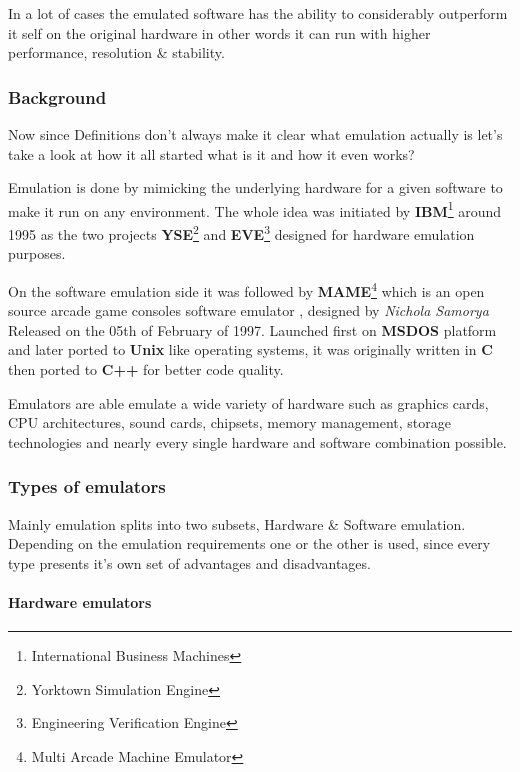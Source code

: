 \documentclass[
  14pt,
  english,
  a4paper,
]{scrreprt}
\begin{document}
In a lot of cases the emulated software has the ability to considerably
outperform it self on the original hardware in other words it can run
with higher performance, resolution \& stability.

\hypertarget{background}{%
\subsubsection{Background}\label{background}}

Now since Definitions don't always make it clear what emulation actually
is let's take a look at how it all started what is it and how it even
works?

Emulation is done by mimicking the underlying hardware for a given
software to make it run on any environment. The whole idea was initiated
by \textbf{IBM}\footnote{International Business Machines} around 1995 as
the two projects \textbf{YSE}\footnote{Yorktown Simulation Engine} and
\textbf{EVE}\footnote{Engineering Verification Engine} designed for
hardware emulation purposes.

On the software emulation side it was followed by
\textbf{MAME}\footnote{Multi Arcade Machine Emulator} which is an open
source arcade game consoles software emulator , designed by
\emph{Nichola Samorya} Released on the 05th of February of 1997.
Launched first on \textbf{MSDOS} platform and later ported to
\textbf{Unix} like operating systems, it was originally written in
\textbf{C} then ported to \textbf{C++} for better code quality.

Emulators are able emulate a wide variety of hardware such as graphics
cards, CPU architectures, sound cards, chipsets, memory management,
storage technologies and nearly every single hardware and software
combination possible.

\hypertarget{types-of-emulators}{%
\subsubsection{Types of emulators}\label{types-of-emulators}}

Mainly emulation splits into two subsets, Hardware \& Software
emulation. Depending on the emulation requirements one or the other is
used, since every type presents it's own set of advantages and
disadvantages.

\hypertarget{hardware-emulators}{%
\paragraph{Hardware emulators}\label{hardware-emulators}}
\end{document}
